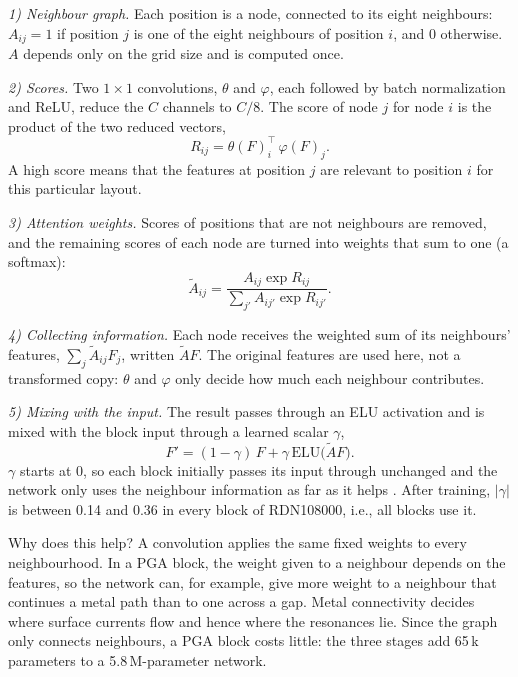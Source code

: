 \documentclass[journal]{IEEEtran}
\begin{document}
\emph{1) Neighbour graph.} Each position is a node, connected to its eight neighbours: $A_{ij}=1$ if position $j$ is one of the eight neighbours of position $i$, and 0 otherwise. $A$ depends only on the grid size and is computed once.

\emph{2) Scores.} Two $1\times1$ convolutions, $\theta$ and $\varphi$, each followed by batch normalization and ReLU, reduce the $C$ channels to $C/8$. The score of node $j$ for node $i$ is the product of the two reduced vectors,
\begin{equation}
R_{ij}=\theta(F)_i^{\top}\,\varphi(F)_j .
\end{equation}
A high score means that the features at position $j$ are relevant to position $i$ for this particular layout.

\emph{3) Attention weights.} Scores of positions that are not neighbours are removed, and the remaining scores of each node are turned into weights that sum to one (a softmax):
\begin{equation}
\tilde{A}_{ij}=\frac{A_{ij}\exp R_{ij}}{\sum_{j'}A_{ij'}\exp R_{ij'}} .
\label{eq:masked}
\end{equation}

\emph{4) Collecting information.} Each node receives the weighted sum of its neighbours' features, $\sum_j\tilde{A}_{ij}F_j$, written $\tilde{A}F$. The original features are used here, not a transformed copy: $\theta$ and $\varphi$ only decide how much each neighbour contributes.

\emph{5) Mixing with the input.} The result passes through an ELU activation and is mixed with the block input through a learned scalar $\gamma$,
\begin{equation}
F' = (1-\gamma)\,F + \gamma\,\mathrm{ELU}\big(\tilde{A}F\big).
\label{eq:gate}
\end{equation}
$\gamma$ starts at 0, so each block initially passes its input through unchanged and the network only uses the neighbour information as far as it helps \cite{deepgcn}. After training, $|\gamma|$ is between 0.14 and 0.36 in every block of RDN108000, i.e., all blocks use it.

Why does this help? A convolution applies the same fixed weights to every neighbourhood. In a PGA block, the weight given to a neighbour depends on the features, so the network can, for example, give more weight to a neighbour that continues a metal path than to one across a gap. Metal connectivity decides where surface currents flow and hence where the resonances lie. Since the graph only connects neighbours, a PGA block costs little: the three stages add 65\,k parameters to a 5.8\,M-parameter network.
\end{document}
